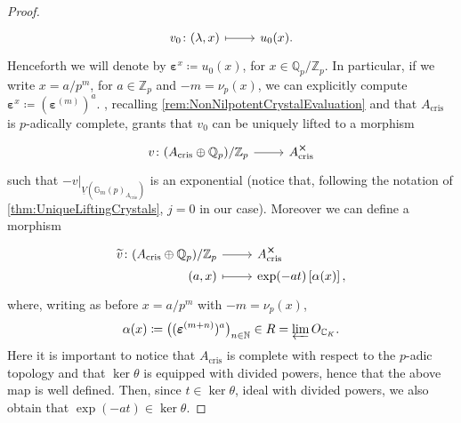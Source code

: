 \begin{proof}
\begin{equation*}
\begin{tikzcd}[row sep = 0ex
		,/tikz/column 1/.append style={anchor=base east}
		,/tikz/column 2/.append style={anchor=base west}]
		v_0\colon 
		(\lambda, x) \arrow[r, "", mapsto] & 
		u_0(x)
	.\end{tikzcd}
	\end{equation*} 
	Henceforth we will denote by $\boldsymbol\varepsilon^x \coloneqq u_0(x)$,
	for $x \in \mathbb{Q}_p/\mathbb{Z}_{p}$.
	In particular, if we write $x = a/p^m$, for $a \in \mathbb{Z}_{p}$ and $-m = \nu_p(x)$,
	we can explicitly compute $\boldsymbol\varepsilon^x \coloneqq 
	\left( \boldsymbol\varepsilon^{(m)} \right)^a$.
	, recalling \cref{rem:NonNilpotentCrystalEvaluation}
	and that $A_{\mathrm{cris}}$ is $p$-adically complete,
	grants that $v_0$ can be uniquely
	lifted to a morphism
	\begin{equation*}
	\begin{tikzcd}[row sep = 0ex
		,/tikz/column 1/.append style={anchor=base east}
		,/tikz/column 2/.append style={anchor=base west}]
		v\colon ( A_{\mathrm{cris}} \oplus \mathbb{Q}_p) / \mathbb{Z}_{p} 
		\arrow[r, "", rightarrow] &
		A_{\mathrm{cris}}^{\cross}
	\end{tikzcd}
	\end{equation*} 
	such that $\left.-v\right|_{ \underline{V}(\mathbb{G}_m(p)_{A_{\mathrm{cris}}}) }$
	is an exponential (notice that, following the notation of \cref{thm:UniqueLiftingCrystals},
	$j = 0$ in our case).
	Moreover we can define a morphism
	\begin{equation*}
	\begin{tikzcd}[row sep = 0ex
		,/tikz/column 1/.append style={anchor=base east}
		,/tikz/column 2/.append style={anchor=base west}]
		\widetilde{v}\colon 
		(A_{\mathrm{cris}} \oplus \mathbb{Q}_p) / \mathbb{Z}_{p}
		\arrow[r, "", rightarrow] &
		A_{\mathrm{cris}}^{\cross} \\
		(a,x) \arrow[r, "", mapsto] & 
		\exp(-at)\left[ \alpha(x) \right]
	,\end{tikzcd}
	\end{equation*} 
	where, writing as before $x = a/p^m$ with $-m = \nu_p(x)$,
	\begin{equation*}
	\alpha(x) \coloneqq \big( (\boldsymbol\varepsilon^{(m+n)})^a \big)_{n \in \mathbb{N}} \in
	R = \varprojlim O_{\mathbb{C}_K}
	.\end{equation*}
	Here it is important to notice that $A_{\mathrm{cris}}$ is complete
	with respect to the $p$-adic topology and that $\ker\theta$
	is equipped with divided powers, hence that the above map is well defined.
	Then, since $t \in \ker \theta$, ideal with divided powers, we also obtain that
	$\exp(-at) \in \ker\theta$.

\end{proof}
